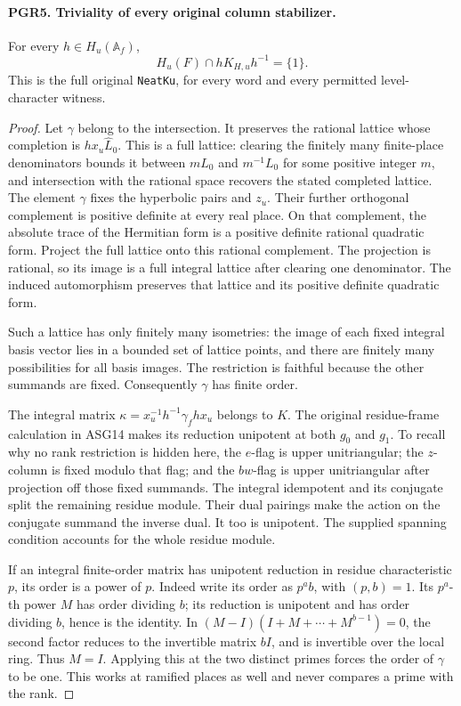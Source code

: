 \paragraph{PGR5. Triviality of every original column stabilizer.}
\label{claim:PGR5}
For every \(h\in H_u(\mathbb A_f)\),
\[
          H_u(F)\cap hK_{H,u}h^{-1}=\{1\}.
\tag{PGR.14}
\]
This is the full original \texttt{NeatKu}, for every word and
every permitted level-character witness.
\begin{proof}
Let \(\gamma\) belong to the intersection.  It preserves the
rational lattice whose completion is \(hx_u\widehat L_0\).
This is a full lattice: clearing the finitely many finite-place
denominators bounds it between \(mL_0\) and \(m^{-1}L_0\)
for some positive integer \(m\), and intersection with the rational
space recovers the stated completed lattice.  The element \(\gamma\)
fixes the hyperbolic pairs and \(z_u\).  Their further orthogonal
complement is positive definite at every real place.  On that
complement, the absolute trace of the Hermitian form is a positive
definite rational quadratic form.  Project the full lattice onto
this rational complement.  The projection is rational, so its image
is a full integral lattice after clearing one denominator.
The induced automorphism preserves that lattice and its positive
definite quadratic form.

Such a lattice has only finitely many isometries: the image of each
fixed integral basis vector lies in a bounded set of lattice points,
and there are finitely many possibilities for all basis images.
The restriction is faithful because the other summands are fixed.
Consequently \(\gamma\) has finite order.

The integral matrix
\(\kappa=x_u^{-1}h^{-1}\gamma_fhx_u\) belongs to \(K\).
The original residue-frame calculation in ASG14 makes its reduction
unipotent at both \(g_0\) and \(g_1\).  To recall why no rank
restriction is hidden here, the \(e\)-flag is upper unitriangular;
the \(z\)-column is fixed modulo that flag; and the \(bw\)-flag
is upper unitriangular after projection off those fixed summands.
The integral idempotent and its conjugate split the remaining
residue module.  Their dual pairings make the action on the conjugate
summand the inverse dual.  It too is unipotent.  The supplied spanning
condition accounts for the whole residue module.

If an integral finite-order matrix has unipotent reduction in residue
characteristic \(p\), its order is a power of \(p\).  Indeed write
its order as \(p^ab\), with \((p,b)=1\).  Its \(p^a\)-th
power \(M\) has order dividing \(b\); its reduction is unipotent
and has order dividing \(b\), hence is the identity.  In
\((M-I)(I+M+\cdots+M^{b-1})=0\), the second factor reduces
to the invertible matrix \(bI\), and is invertible over the local
ring.  Thus \(M=I\).  Applying this at the two distinct primes
forces the order of \(\gamma\) to be one.  This works at ramified
places as well and never compares a prime with the rank.
\end{proof}

